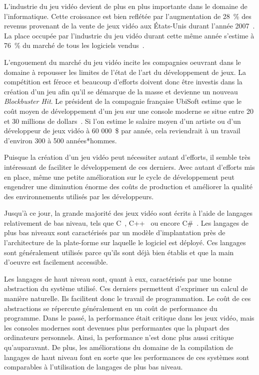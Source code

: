 \documentclass[12pt,twoside,letterpaper,francais]{book}
\begin{document}
L'industrie du jeu vidéo devient de plus en plus importante dans le
domaine de l'informatique. Cette croissance est bien reflétée par
l'augmentation de 28~\% des revenus provenant de la vente de jeux vidéo
aux États-Unis durant l'année 2007~\cite{NPD_Games_2007}. La place
occupée par l'industrie du jeu vidéo durant cette même année s'estime
à 76~\% du marché de tous les logiciels vendus~\cite{NPD_Soft_2008}. 

L'engouement du marché du jeu vidéo incite les compagnies oeuvrant
dans le domaine à repousser les limites de l'état de l'art du
dévelop\-pement de jeux. La compétition est féroce et beaucoup d'efforts
doivent donc être investis dans la création d'un jeu afin qu'il se
démarque de la masse et devienne un nouveau \textit{Blockbuster
  Hit}. Le président de la compagnie française UbiSoft estime que le
coût moyen de dévelop\-pement d'un jeu sur une console moderne se situe
entre 20 et 30 millions de dollars~\cite{cbc_ubisoft}. Si l'on estime
le salaire moyen d'un artiste ou d'un développeur de jeux vidéo à 60
000~\$ par année, cela reviendrait à un travail d'environ 300 à 500
années*hommes.

Puisque la création d'un jeu vidéo peut nécessiter autant d'efforts,
il semble très intéressant de faciliter le dévelop\-pement de ces
derniers. Avec autant d'efforts mis en place, même une petite
amélioration sur le cycle de dévelop\-pement peut engendrer une
diminution énorme des coûts de production et améliorer la qualité des
environnements utilisés par les développeurs.

Jusqu'à ce jour, la grande majorité des jeux vidéo sont écrits à
l'aide de langages relativement de bas niveau, tels que
C~\cite{Ritchie-C-dev}, C++~\cite{cplusplus} ou encore
C\#~\cite{CSHARP_SPEC}. Les langages de plus bas niveaux sont
caractérisés par un modèle d'implantation près de l'architecture de la
plate-forme sur laquelle le logiciel est déployé. Ces langages sont
généralement utilisés parce qu'ils sont déjà bien établis et que la
main d'oeuvre est facilement accessible.

Les langages de haut niveau sont, quant à eux, caractérisés par une
bonne abstraction du système utilisé. Ces derniers permettent
d'exprimer un calcul de manière naturelle. Ils facilitent donc le
travail de programmation. Le coût de ces abstractions se répercute
généralement en un coût de performance du programme. Dans le passé, la
performance était critique dans les jeux vidéo, mais les consoles
modernes sont devenues plus performantes que la plupart des
ordinateurs personnels. Ainsi, la performance n'est donc plus aussi
critique qu'auparavant. De plus, les améliorations du domaine de la
compilation de langages de haut niveau font en sorte que les
performances de ces systèmes sont comparables à l'utilisation de
langages de plus bas niveau.
\end{document}
